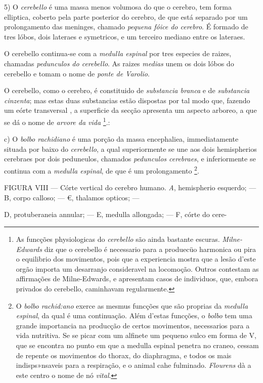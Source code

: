 5) O \emph{cerebello} é uma massa menos volumosa do que o cerebro, tem forma elliptica, coberto pela parte posterior do cerebro, de que está separado por um prolongamento das meninges, chamado \emph{pequena fóice do cerebro}. É formado de tres lóbos, dois lateraes e symetricos, e um terceiro mediano entre os lateraes.

O cerebello continua-se com a \emph{medulla espinal} por tres especies de raizes, chamadas \emph{pedunculos do cerebello}. As raizes \emph{medias} unem os dois lóbos do cerebello e tomam o nome de \emph{ponte de Varolio}.

O cerebello, como o cerebro, é constituido de \emph{substancia branca} e de \emph{substancia cinzenta}; mas estas duas substancias estão dispostas por tal modo que, fazendo um eórte transversal  , a superficie da secção apresenta um aspecto arboreo, a que se dá o nome de \emph{arvore da vida} \footnote{As funcções physiologicas do \emph{cerebello} são ainda bastante escuras. \emph{Milne-Edwards} diz que o cerebello é necessario para a produecüo harmonica ou pira o equilibrio dos movimentos, pois que a experiencia mostra que a lesão d'este orgão importa um desarranjo consideravel na locomoção. Outros contestam as affirmações de Milne-Edwards, e apresentam casos de individuos, que, embora privados do cerebello, caminhavam regularmente.}.:

c) O \emph{bolbo rachidiano} é uma porção da massa encephaliea, immediatamente situada por baixo do \emph{cerebello}, a qual superiormente se une aos dois hemispherios cerebraes por dois peduneulos, chamados \emph{pedunculos cerebraes}, e inferiormente se continua com a \emph{medulla espinal}, de que é um prolongamento \footnote{O \emph{bolbo rachid:ano} exerce as mesmus funcções que são proprias da \emph{medulla espinal}, da qual é uma continuação. Além d'estas funcções, o \emph{bolbo} tem uma grande importancia na producção de certos movimentos, necessarios para a vida nutritiva. Se se picar com um alfinete um pequeno sulco em forma de V, que se encontra no punto em que a medulla espinal penetra no craneo, cessam de repente os movimentos do thorax, do diaphragma, e todos os mais indisps»nsaveis para a respiração, e o animal cahe fulminado. \emph{Flourens} dà a este centro o nome de nó \emph{vital}.}.

FIGURA VIII --- Córte vertical do cerebro humano. \emph{A}, hemispherio esquerdo; --- B, corpo calloso; --- €, thalamos opticos; ---

D, protuberaneia annular; --- E, medulla allongada; --- F, córte do cere-

